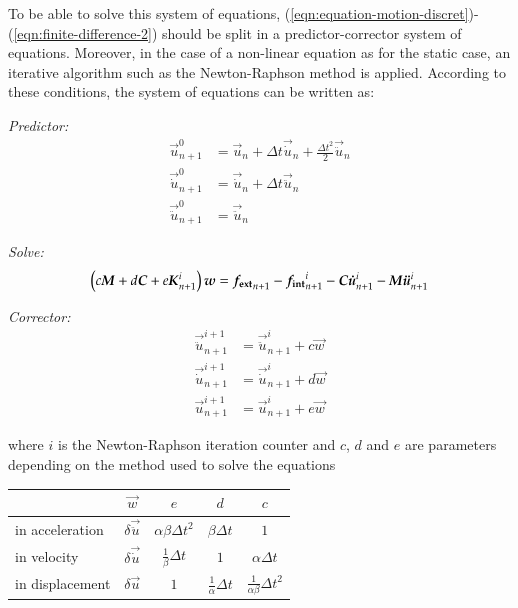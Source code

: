 To     be      able     to      solve     this     system      of     equations,
(\ref{eqn:equation-motion-discret})-(\ref{eqn:finite-difference-2})   should  be
split in a predictor-corrector system of  equations.  Moreover, in the case of a
non-linear equation as  for the static case, an iterative  algorithm such as the
Newton-Raphson method is applied.  According  to these conditions, the system of
equations can be written as:


\noindent\textit{Predictor:}
\begin{align}
  \vec{u}_{n+1}^{0} &=  \vec{u}_{n} +  \Delta t \vec{\dot{u}}_{n}  + \frac{\Delta
    t^2}{2} \vec{\ddot{u}}_{n} \\
  \vec{\dot{u}}_{n+1}^{0}  &= \vec{\dot{u}}_{n} +  \Delta t \vec{\ddot{u}}_{n} \\
  \vec{\ddot{u}}_{n+1}^{0} &= \vec{\ddot{u}}_{n}
\end{align}

\noindent\textit{Solve:}
\begin{align}
  \left(c \boldsymbol{M} + d \boldsymbol{C}  + e \boldsymbol{K}_{n+1}^i\right) \boldsymbol{w} = \boldsymbol{f_{{\mathrm{ext}}}}_{n+1} -
  \boldsymbol{f_{{\mathrm{int}}}}_{n+1}^i    -   \boldsymbol{C}    \boldsymbol{\dot{u}}_{n+1}^i    -   \boldsymbol{M}
  \boldsymbol{\ddot{u}}_{n+1}^i
\end{align}

\noindent\textit{Corrector:}
\begin{align}
  \vec{\ddot{u}}_{n+1}^{i+1} &= \vec{\ddot{u}}_{n+1}^{i} + c \vec{w} \\
  \vec{\dot{u}}_{n+1}^{i+1} &= \vec{\dot{u}}_{n+1}^{i} + d \vec{w} \\
  \vec{u}_{n+1}^{i+1} &= \vec{u}_{n+1}^{i} + e \vec{w}
\end{align}

where  $i$ is  the Newton-Raphson  iteration counter  and $c$,  $d$ and  $e$ are
parameters depending on the method used to solve the equations

\begin{center}
  \begin{tabular}{lcccc}
    \toprule
    & $\vec{w}$ & $e$ & $d$ & $c$\\
    \midrule
    in  acceleration  &$ \delta\vec{\ddot{u}}$  &  $\alpha  \beta \Delta  t^2$
    &$\beta \Delta t$ &$1$\\
    in velocity  & $ \delta\vec{\dot{u}}$&  $\frac{1}{\beta} \Delta t$  & $1$ &
    $\alpha \Delta t$\\
    in displacement  &$\delta\vec{u}$  & $ 1$  & $\frac{1}{\alpha} \Delta  t$ &
    $\frac{1}{\alpha \beta} \Delta t^2$\\
    \bottomrule
  \end{tabular}
\end{center}


